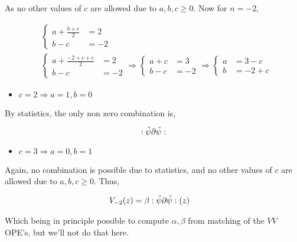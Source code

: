 As no other values of $c$ are allowed due to $a,b,c\geq0$. Now for $n=-2$,

\begin{align*}
    &\begin{cases}
        a+\frac{b+c}{2}&=2\\
        b-c&=-2
    \end{cases}\\
    &\begin{cases}
        a+\frac{-2+c+c}{2}&=2\\
        b-c&=-2
    \end{cases}\Rightarrow
    \begin{cases}
        a+c&=3\\
        b-c&=-2
    \end{cases}\Rightarrow
    \begin{cases}
        a&=3-c\\
        b&=-2+c
    \end{cases}
\end{align*}

\begin{itemize}
    \item $c=2\Rightarrow a=1,b=0$
\end{itemize}

By statistics, the only non zero combination is,

$$:\tilde\psi\partial\tilde\psi:$$

\begin{itemize}
    \item $c=3\Rightarrow a=0,b=1$
\end{itemize}

Again, no combination is possible due to statistics, and no other values of $c$ are allowed due to $a,b,c\geq0$. Thus,

\begin{align*}
    V_{-2}\qty(z)&=\beta:\tilde\psi\partial\tilde\psi:\qty(z)
\end{align*}

Which being in principle possible to compute $\alpha,\beta$ from matching of the $VV$ OPE's, but we'll not do that here.